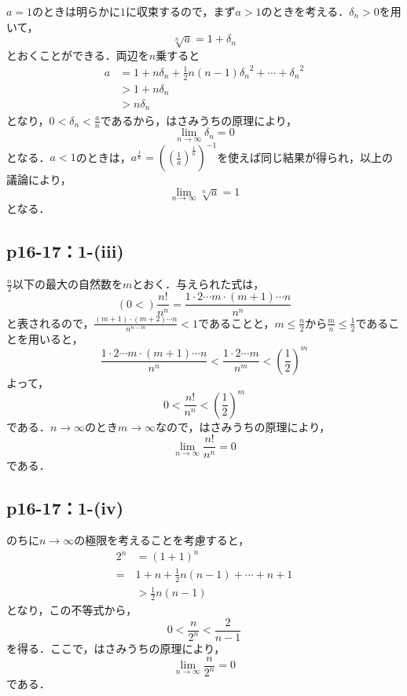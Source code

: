 \documentclass[uplatex,dvipdfmx,a4paper,10pt,fleqn]{jsarticle}
\begin{document}
\begin{tleftbar}
    $a=1$のときは明らかに$1$に収束するので，まず$a>1$のときを考える．$\delta_n >0$を用いて，
    \[
        \sqrt[n]{a} =1+\delta_n
    \]
    とおくことができる．両辺を$n$乗すると
    \begin{align*}
        a& = 1+ n \delta_n + \frac{1}{2}n(n-1) {\delta_n}^2 + \cdots + {\delta_n}^2 \\
        &>1+n \delta_n \\
        & >n \delta_n
    \end{align*}
    となり，$0<\delta_n <\frac{a}{n}$であるから，はさみうちの原理により，
    \[
        \lim_{n \to \infty} \delta_n =0
    \]
    となる．$a<1$のときは，$a^{\frac{1}{n}}=\left(\left(\frac{1}{a}\right)^{\frac{1}{n}}\right)^{-1}$を使えば同じ結果が得られ，以上の議論により，
    \[
        \lim_{n \to \infty} \sqrt[n]{a} =1
    \]
    となる．
\end{tleftbar}

\subsection*{p16-17：1-(iii)}

\begin{tleftbar}
    $\frac{n}{2}$以下の最大の自然数を$m$とおく．与えられた式は，
    \[
       \left( 0  < \right) \frac{n!}{n^n}  = \frac{1 \cdot 2 \dotsm m \cdot (m+1) \dotsm n}{n^n}
    \]
    と表されるので，$\frac{(m+1) \cdot (m+2) \dotsm n}{n^{n-m}} <1$であることと，$m \le \frac{n}{2}$から$\frac{m}{n} \le \frac{1}{2}$であることを用いると，
    \[
        \frac{1 \cdot 2 \dotsm m \cdot (m+1) \dotsm n}{n^n} < \frac{1 \cdot 2 \dotsm m}{n^m} <\left(\frac{1}{2}\right)^m
    \]
    よって，
    \[
        0 < \frac{n!}{n^n} <\left(\frac{1}{2}\right)^m
    \]
    である．$n \to \infty$のとき$m \to \infty$なので，はさみうちの原理により，
    \[
        \lim_{n \to \infty}\frac{n!}{n^n} =0
    \]
    である．
\end{tleftbar}
\subsection*{p16-17：1-(iv)}
\begin{tleftbar}
    のちに$n \to \infty$の極限を考えることを考慮すると，
    \begin{align*}
        2^n &= (1+1)^n \\
        =& 1+n +\frac{1}{2} n(n-1)+ \cdots +n+1 \\
        & > \frac{1}{2} n(n-1)
    \end{align*}
    となり，この不等式から，
    \[
        0< \frac{n}{2^n} < \frac{2}{n-1}
    \]
    を得る．ここで，はさみうちの原理により，
    \[
        \lim_{n \to \infty} \frac{n}{2^n}=0
    \]
    である．
\end{tleftbar}
\end{document}
